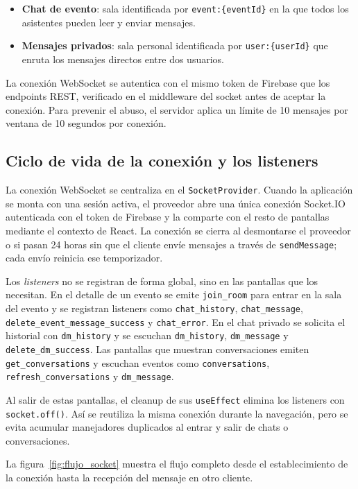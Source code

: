 \begin{itemize}
    \item \textbf{Chat de evento}: sala identificada por \texttt{event:\{eventId\}} en la que todos los asistentes pueden leer y enviar mensajes.
    \item \textbf{Mensajes privados}: sala personal identificada por \texttt{user:\{userId\}} que enruta los mensajes directos entre dos usuarios.
\end{itemize}

La conexión WebSocket se autentica con el mismo token de Firebase que los endpoints REST, verificado en el middleware del socket antes de aceptar la conexión. Para prevenir el abuso, el servidor aplica un límite de 10 mensajes por ventana de 10 segundos por conexión.

\subsection{Ciclo de vida de la conexión y los listeners}

La conexión WebSocket se centraliza en el \texttt{SocketProvider}. Cuando la aplicación se monta con una sesión activa, el proveedor abre una única conexión Socket.IO autenticada con el token de Firebase y la comparte con el resto de pantallas mediante el contexto de React. La conexión se cierra al desmontarse el proveedor o si pasan 24 horas sin que el cliente envíe mensajes a través de \texttt{sendMessage}; cada envío reinicia ese temporizador.

Los \textit{listeners} no se registran de forma global, sino en las pantallas que los necesitan. En el detalle de un evento se emite \texttt{join\_room} para entrar en la sala del evento y se registran listeners como \texttt{chat\_history}, \texttt{chat\_message}, \texttt{delete\_event\_message\_success} y \texttt{chat\_error}. En el chat privado se solicita el historial con \texttt{dm\_history} y se escuchan \texttt{dm\_history}, \texttt{dm\_message} y \texttt{delete\_dm\_success}. Las pantallas que muestran conversaciones emiten \texttt{get\_conversations} y escuchan eventos como \texttt{conversations}, \texttt{refresh\_conversations} y \texttt{dm\_message}.

Al salir de estas pantallas, el cleanup de sus \texttt{useEffect} elimina los listeners con \texttt{socket.off()}. Así se reutiliza la misma conexión durante la navegación, pero se evita acumular manejadores duplicados al entrar y salir de chats o conversaciones.

La figura~\ref{fig:flujo_socket} muestra el flujo completo desde el establecimiento de la conexión hasta la recepción del mensaje en otro cliente.

